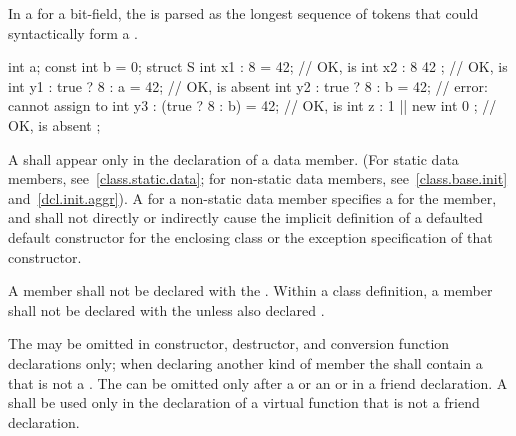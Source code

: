 \pnum
In a  for a bit-field,
the  is parsed as
the longest sequence of tokens
that could syntactically form a .
\begin{example}
\begin{codeblock}
int a;
const int b = 0;
struct S {
  int x1 : 8 = 42;              // OK,  is 
  int x2 : 8 { 42 };            // OK,  is 
  int y1 : true ? 8 : a = 42;   // OK,  is absent
  int y2 : true ? 8 : b = 42;   // error: cannot assign to 
  int y3 : (true ? 8 : b) = 42; // OK,  is 
  int z : 1 || new int { 0 };   // OK,  is absent
};
\end{codeblock}
\end{example}

\pnum
A  shall appear only in the
declaration of a data member. (For static data members,
see~\ref{class.static.data}; for non-static data members,
see~\ref{class.base.init} and~\ref{dcl.init.aggr}).
A  for a non-static data member
%
specifies a  for the member, and
shall not directly or indirectly cause the implicit definition of a
defaulted default constructor for the enclosing class or the
exception specification of that constructor.

\pnum
A member shall not be declared with the 
. Within a class definition, a member shall not be declared with the   unless also declared .

\pnum
The  may be omitted in constructor, destructor,
and conversion function declarations only;
when declaring another kind of member the 
shall contain a  that is not a .
The
 can be omitted only after a
 or an  or in a
friend declaration. A
 shall be used only in the declaration of a
virtual function
that is not a friend declaration.

